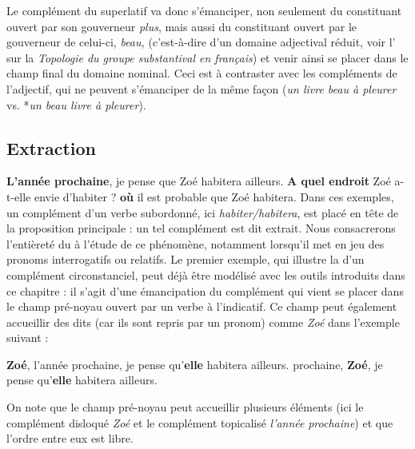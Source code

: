 Le complément du superlatif va donc s’émanciper, non seulement du constituant ouvert par son gouverneur \textit{plus}, mais aussi du constituant ouvert par le gouverneur de celui-ci, \textit{beau,} (c’est-à-dire d’un domaine adjectival réduit, voir l’ sur la \textit{Topologie du groupe substantival en français}) et venir ainsi se placer dans le champ final du domaine nominal. Ceci est à contraster avec les compléments de l’adjectif, qui ne peuvent s’émanciper de la même façon (\textit{un livre beau à pleurer} vs. *\textit{un beau livre à pleurer}).

\subsection{Extraction}
\ea
\ea \textbf{{L’année}  {prochaine}},  {je pense que Zoé habitera ailleurs.}
\ex \textbf{{A quel endroit}}  {Zoé a-t-elle envie d’habiter} ?
 \textbf{{où}}  {il est probable que Zoé habitera.}
\z
\z
Dans ces exemples, un complément d’un verbe subordonné, ici \textit{habiter/habitera}, est placé en tête de la proposition principale : un tel complément est dit extrait. Nous consacrerons l’entièreté du  à l’étude de ce phénomène, notamment lorsqu’il met en jeu des pronoms interrogatifs ou relatifs. Le premier exemple, qui illustre la  d’un complément circonstanciel, peut déjà être modélisé avec les outils introduits dans ce chapitre : il s’agit d’une émancipation du complément qui vient se placer dans le champ pré-noyau ouvert par un verbe à l’indicatif. Ce champ peut également accueillir des  dits  (car ils sont repris par un pronom) comme \textit{Zoé} dans l’exemple suivant :

\ea
\ea \textbf{{Zoé}},  {l’année}  {prochaine,}  {je pense qu’}\textbf{{elle}}  {habitera ailleurs.}
  {prochaine,} \textbf{{Zoé}},  {je pense qu’}\textbf{{elle}}  {habitera ailleurs.}
\z
\z

On note que le champ pré-noyau peut accueillir plusieurs éléments (ici le complément disloqué \textit{Zoé} et le complément topicalisé \textit{l’année} \textit{prochaine}) et que l’ordre entre eux est libre.

